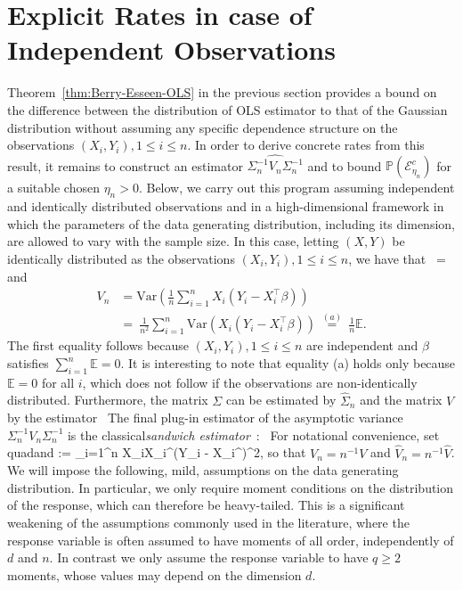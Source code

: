 \documentclass{article}
\begin{document}
\section{Explicit Rates in case of Independent Observations}
\label{section::explicit}
Theorem~\ref{thm:Berry-Esseen-OLS} in the previous section provides a bound on the difference between the distribution of OLS estimator to that of the Gaussian distribution without assuming any specific dependence structure on the observations $(X_i, Y_i), 1 \le i\le n$. In order to derive concrete rates from this result, it remains to construct an estimator $\widehat{\Sigma_n^{-1}V_n\Sigma_n^{-1}}$ and to bound $\mathbb{P}(\mathcal{E}_{\eta_n}^c)$ for a suitable chosen $\eta_n > 0$.
Below, we carry out this program assuming independent and identically distributed observations and in a high-dimensional framework in which the parameters of the data generating distribution, including its dimension, are allowed to vary with the sample size. In this case, letting $(X, Y)$ be identically distributed as the observations $(X_i, Y_i), 1\le i\le n$, we have that
\ = 
\]
and
\begin{align*}
V_n &= \mbox{Var}\left(\frac{1}{n}\sum_{i=1}^n X_i(Y_i - X_i^{\top}\beta)\right)\\ ~&=~ \frac{1}{n^2}\sum_{i=1}^n \mbox{Var}(X_i(Y_i - X_i^{\top}\beta)) ~\overset{(a)}{=}~ \frac{1}{n}\mathbb{E}.
\end{align*}
The first equality follows because $(X_i, Y_i), 1\le i\le n$ are independent and $\beta$ satisfies $\sum_{i=1}^n \mathbb{E} = 0$. It is interesting to note that equality (a) holds only because $\mathbb{E} = 0$ for all $i$, which does not follow if the observations are non-identically distributed.
Furthermore,
the matrix $\Sigma$ can be estimated by $\widehat{\Sigma}_n$ and the matrix $V$ by the estimator
\ The final plug-in estimator of the
asymptotic variance $\Sigma_n^{-1}V_n\Sigma_n^{-1}$ is the classical{\em sandwich estimator}~\citep{White1980,Buja14}:
\ For notational convenience, set
\\quad\mbox{and}\quad {} := \sum_{i=1}^n X_iX_i^{\top}(Y_i - X_i^{\top}\widehat{\beta})^2,
\]
so that $V_n = n^{-1}V$ and $\widehat{V}_n = n^{-1}\widehat{V}$.
We will impose the following, mild, assumptions on the data generating distribution. In particular, we only require moment conditions
on the distribution of the response, which can therefore be heavy-tailed. This is a significant weakening of the assumptions commonly used in the literature, where the response variable is often assumed to have moments of all order, independently of $d$ and $n$. In contrast we only assume the response variable to have $q \geq 2 $ moments, whose values may depend on the dimension $d$.
\end{document}
